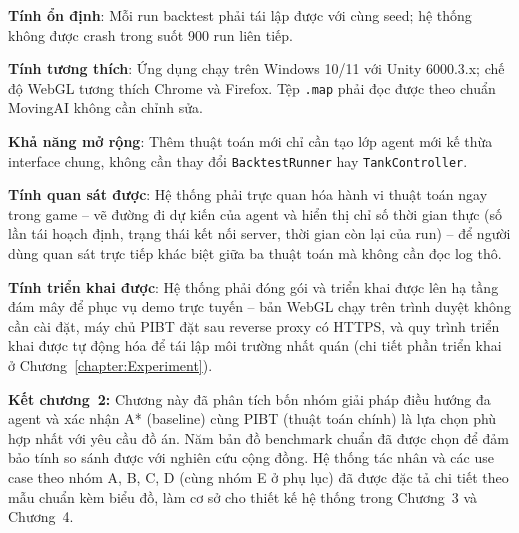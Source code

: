 \documentclass[../DoAn.tex]{subfiles}
\begin{document}
\textbf{Tính ổn định}: Mỗi run backtest phải tái lập được với cùng seed; hệ thống không
được crash trong suốt 900 run liên tiếp.

\textbf{Tính tương thích}: Ứng dụng chạy trên Windows 10/11 với Unity 6000.3.x; chế
độ WebGL tương thích Chrome và Firefox. Tệp \texttt{.map} phải đọc được theo chuẩn
MovingAI không cần chỉnh sửa.

\textbf{Khả năng mở rộng}: Thêm thuật toán mới chỉ cần tạo lớp agent mới kế thừa
interface chung, không cần thay đổi \texttt{BacktestRunner} hay \texttt{TankController}.

\textbf{Tính quan sát được}: Hệ thống phải trực quan hóa hành vi thuật toán ngay trong game --
vẽ đường đi dự kiến của agent và hiển thị chỉ số thời gian thực (số lần tái hoạch định, trạng
thái kết nối server, thời gian còn lại của run) -- để người dùng quan sát trực tiếp khác biệt
giữa ba thuật toán mà không cần đọc log thô.

\textbf{Tính triển khai được}: Hệ thống phải đóng gói và triển khai được lên hạ tầng đám mây để
phục vụ demo trực tuyến -- bản WebGL chạy trên trình duyệt không cần cài đặt, máy chủ PIBT đặt
sau reverse proxy có HTTPS, và quy trình triển khai được tự động hóa để tái lập môi trường nhất
quán (chi tiết phần triển khai ở Chương~\ref{chapter:Experiment}).

\textbf{Kết chương~2:} Chương này đã phân tích bốn nhóm giải pháp điều hướng đa agent
và xác nhận A* (baseline) cùng PIBT (thuật toán chính) là lựa chọn phù hợp nhất với yêu
cầu đồ án. Năm bản đồ benchmark chuẩn đã được chọn để đảm bảo tính so sánh được với
nghiên cứu cộng đồng. Hệ thống tác nhân và các use case theo nhóm A, B, C, D (cùng nhóm
E ở phụ lục) đã được đặc tả chi tiết theo mẫu chuẩn kèm biểu đồ, làm cơ sở cho thiết kế
hệ thống trong Chương~3 và Chương~4.
\end{document}
